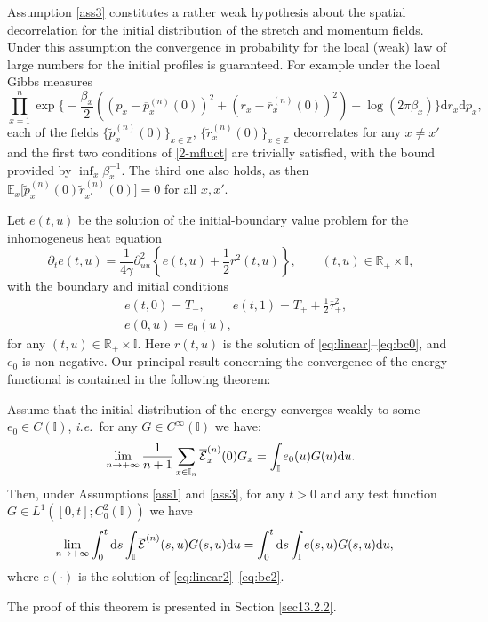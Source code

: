 \documentclass[EJP]{ejpecp} %
\newcommand\bbZ{{\mathbb Z}}
\newcommand\bbE{{\mathbb E}}
\newcommand\R{{\mathbb R}}
\newcommand\T{{\mathbb I}}
\newcommand \ga{\gamma}
\newcommand{\dd  }{\mathrm{d}}
\renewcommand{\tilde}{\widetilde}
\renewcommand{\bar}{\overline}
\numberwithin{equation}{section}
\begin{document}
{ Assumption \ref{ass3} constitutes a rather weak hypothesis about
  the spatial
  decorrelation for the initial distribution of the stretch and
  momentum fields. Under this assumption
  the convergence in probability for the local (weak)
  law of large numbers  for the initial profiles is guaranteed.
  For example under the local Gibbs measures 
\begin{equation*}
  \prod_{x=1}^n
  \exp\bigg\{-\frac{\beta_x}{2}\left( (p_x - \bar p_x^{(n)}(0))^2
    +(r_x - \bar r_x^{(n)}(0))^2\right) - \log(2\pi\beta_x) \bigg\} \dd r_x\dd p_x,
\end{equation*}
each of the fields $\big\{\tilde p_x^{(n)}(0)\big\}_{x\in\bbZ}$, $\big\{\tilde
r_x^{(n)}(0)\big\}_{x\in\bbZ}$  decorrelates for any $x\neq x'$ and the
first two conditions of
\eqref{2-mfluct} are trivially satisfied, with the bound provided by
$\inf_x\beta_x^{-1}$. The third one also holds, as then
$\bbE_x\big[\tilde p_x^{(n)}(0) \tilde r_{x'}^{(n)}(0)\big]=0$ for
all $x,x'$.
}




Let $e(t,u)$ be the solution of the initial-boundary value problem for
the inhomogeneus heat equation
    \begin{equation}
 \partial_t e (t,u) =  \frac 1{4\ga}  \partial^2_{uu}
   \left\{  e(t,u) +
       \frac 12 r^2(t,u)\right\},\qquad
        (t,u)\in \R_+\times \T ,\label{eq:linear2}\end{equation}
        with the boundary and initial conditions \begin{equation}  \label{eq:bc2}\begin{split}
&e (t,0) = T_-, \qquad \ e(t,1) = T_+ + \frac12\bar\tau_+^2,\\
 & e(0,u)= e_0(u), 
\end{split} \end{equation}  for any $(t,u)\in \R_+\times \T$.
%
Here $r(t,u)$ is the solution of  \eqref{eq:linear}--\eqref{eq:bc0}, and $e_0$ is non-negative.
Our principal result concerning the convergence of the energy
functional is contained in the following {theorem}:
\begin{theorem}
\label{main-result}
Assume  that the initial distribution of the energy converges weakly to some $e_0 \in C(\T)$, \emph{i.e.}~for any $G\in C^\infty(\T)$ we have:
\begin{equation}
\label{weak-E0}
\lim_{n\to+\infty}\frac{1}{n+1}\sum_{x\in \T_n}\bar{\cal
  E}_x^{(n)}(0)G_x=\int_{\T}e_0(u)G(u)\dd u.
\end{equation}
Then, under Assumptions \ref{ass1}   and  \ref{ass3},
for any $t>0$ and  any test function $G\in
L^1([0,t]; C_{0}^2(\T))$ we have
\begin{equation}
\label{060401-20y}
\lim_{n\to+\infty}\int_0^{t}\dd s\int_\T\bar{\cal 
E}^{(n)} (s,u)G(s,u)\dd u= \int_0^{t}\dd s\int_\T
e (s,u)G(s,u)\dd u,\quad 
\end{equation}
where $e(\cdot)$ is the solution of \eqref{eq:linear2}--\eqref{eq:bc2}.
\end{theorem}
The proof of this theorem is presented in Section \ref{sec13.2.2}.
\end{document}
